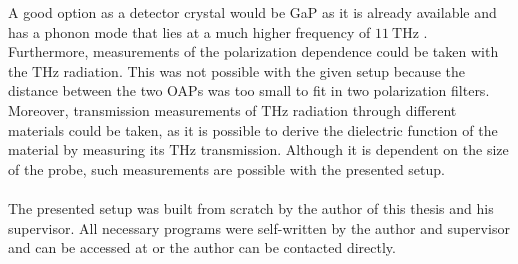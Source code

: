 A good option as a detector crystal would be GaP as it is already available and has a phonon mode that lies at a much higher frequency of $\SI{11}{\tera\hertz}$ \cite{phonon_GaP}.
\\
Furthermore, measurements of the polarization dependence could be taken with the $\si{\tera\hertz}$ radiation.
This was not possible with the given setup because the distance between the two OAPs was too small to fit in two polarization filters.
Moreover, transmission measurements of $\si{\tera\hertz}$ radiation through different materials could be taken, as it is possible to derive the dielectric function of the material by measuring its $\si{\tera\hertz}$ transmission.
Although it is dependent on the size of the probe, such measurements are possible with the presented setup.
\\\\
The presented setup was built from scratch by the author of this thesis and his supervisor.
All necessary programs were self-written by the author and supervisor and can be accessed at \cite{github} or the author can be contacted directly.
